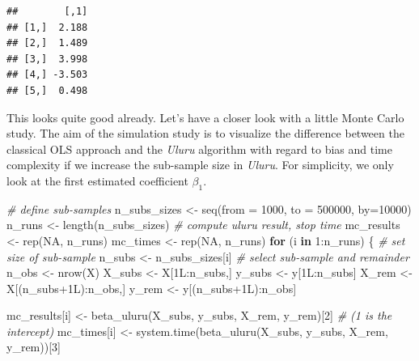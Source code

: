 \documentclass[
  12pt,
]{style/krantz}
\newenvironment{Shaded}{\begin{snugshade}}{\end{snugshade}}
\newcommand{\AttributeTok}[1]{\textcolor[rgb]{0.77,0.63,0.00}{#1}}
\newcommand{\CommentTok}[1]{\textcolor[rgb]{0.56,0.35,0.01}{\textit{#1}}}
\newcommand{\ConstantTok}[1]{\textcolor[rgb]{0.00,0.00,0.00}{#1}}
\newcommand{\ControlFlowTok}[1]{\textcolor[rgb]{0.13,0.29,0.53}{\textbf{#1}}}
\newcommand{\DecValTok}[1]{\textcolor[rgb]{0.00,0.00,0.81}{#1}}
\newcommand{\FunctionTok}[1]{\textcolor[rgb]{0.00,0.00,0.00}{#1}}
\newcommand{\NormalTok}[1]{#1}
\newcommand{\OtherTok}[1]{\textcolor[rgb]{0.56,0.35,0.01}{#1}}
\newcommand{\SpecialCharTok}[1]{\textcolor[rgb]{0.00,0.00,0.00}{#1}}
\begin{document}
\begin{verbatim}
##        [,1]
## [1,]  2.188
## [2,]  1.489
## [3,]  3.998
## [4,] -3.503
## [5,]  0.498
\end{verbatim}

This looks quite good already. Let's have a closer look with a little Monte Carlo study. The aim of the simulation study is to visualize the difference between the classical OLS approach and the \emph{Uluru} algorithm with regard to bias and time complexity if we increase the sub-sample size in \emph{Uluru}. For simplicity, we only look at the first estimated coefficient \(\beta_{1}\).

\begin{Shaded}
\begin{Highlighting}[]
\CommentTok{\# define sub{-}samples}
\NormalTok{n\_subs\_sizes }\OtherTok{\textless{}{-}} \FunctionTok{seq}\NormalTok{(}\AttributeTok{from =} \DecValTok{1000}\NormalTok{, }\AttributeTok{to =} \DecValTok{500000}\NormalTok{, }\AttributeTok{by=}\DecValTok{10000}\NormalTok{)}
\NormalTok{n\_runs }\OtherTok{\textless{}{-}} \FunctionTok{length}\NormalTok{(n\_subs\_sizes)}
\CommentTok{\# compute uluru result, stop time}
\NormalTok{mc\_results }\OtherTok{\textless{}{-}} \FunctionTok{rep}\NormalTok{(}\ConstantTok{NA}\NormalTok{, n\_runs)}
\NormalTok{mc\_times }\OtherTok{\textless{}{-}} \FunctionTok{rep}\NormalTok{(}\ConstantTok{NA}\NormalTok{, n\_runs)}
\ControlFlowTok{for}\NormalTok{ (i }\ControlFlowTok{in} \DecValTok{1}\SpecialCharTok{:}\NormalTok{n\_runs) \{}
     \CommentTok{\# set size of sub{-}sample}
\NormalTok{     n\_subs }\OtherTok{\textless{}{-}}\NormalTok{ n\_subs\_sizes[i]}
     \CommentTok{\# select sub{-}sample and remainder}
\NormalTok{     n\_obs }\OtherTok{\textless{}{-}} \FunctionTok{nrow}\NormalTok{(X)}
\NormalTok{     X\_subs }\OtherTok{\textless{}{-}}\NormalTok{ X[1L}\SpecialCharTok{:}\NormalTok{n\_subs,]}
\NormalTok{     y\_subs }\OtherTok{\textless{}{-}}\NormalTok{ y[1L}\SpecialCharTok{:}\NormalTok{n\_subs]}
\NormalTok{     X\_rem }\OtherTok{\textless{}{-}}\NormalTok{ X[(n\_subs}\SpecialCharTok{+}\NormalTok{1L)}\SpecialCharTok{:}\NormalTok{n\_obs,]}
\NormalTok{     y\_rem }\OtherTok{\textless{}{-}}\NormalTok{ y[(n\_subs}\SpecialCharTok{+}\NormalTok{1L)}\SpecialCharTok{:}\NormalTok{n\_obs]}
     
\NormalTok{     mc\_results[i] }\OtherTok{\textless{}{-}} \FunctionTok{beta\_uluru}\NormalTok{(X\_subs,}
\NormalTok{                                 y\_subs,}
\NormalTok{                                 X\_rem,}
\NormalTok{                                 y\_rem)[}\DecValTok{2}\NormalTok{] }\CommentTok{\# (1 is the intercept)}
\NormalTok{     mc\_times[i] }\OtherTok{\textless{}{-}} \FunctionTok{system.time}\NormalTok{(}\FunctionTok{beta\_uluru}\NormalTok{(X\_subs,}
\NormalTok{                                           y\_subs,}
\NormalTok{                                           X\_rem,}
\NormalTok{                                           y\_rem))[}\DecValTok{3}\NormalTok{]}
     

\end{Highlighting}
\end{Shaded}
\end{document}
